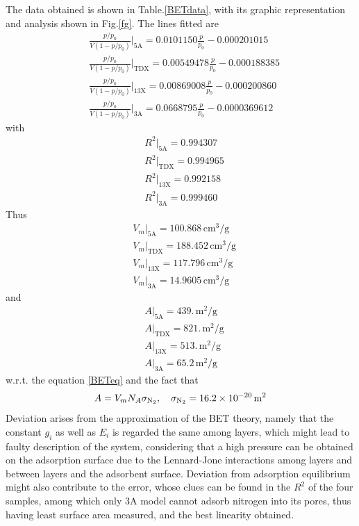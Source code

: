 \documentclass[%
 reprint,
 amsmath,amssymb,
 aps,
10.5pt,
]{revtex4-1}
\begin{document}
The data obtained is shown in Table.\ref{BETdata}, with its graphic representation and analysis shown in Fig.\ref{fg}. The lines fitted are
\begin{align*}
&\frac{p/p_0}{V(1-p/p_0)}\bigg|_\text{5A} = 0.0101150  \frac{p}{p_0}-0.000201015 \\
&\frac{p/p_0}{V(1-p/p_0)}\bigg|_\text{TDX} = 0.00549478\frac{p}{p_0}-0.000188385 \\
&\frac{p/p_0}{V(1-p/p_0)}\bigg|_\text{13X} =  0.00869008 \frac{p}{p_0}-0.000200860 \\
&\frac{p/p_0}{V(1-p/p_0)}\bigg|_\text{3A} = 0.0668795\frac{p}{p_0}-0.0000369612 
   \end{align*}
with
\begin{align*}
& R^2 \bigg|_\text{5A} = 0.994307 \\
& R^2 \bigg|_\text{TDX} = 0.994965 \\
& R^2 \bigg|_\text{13X} = 0.992158 \\
& R^2 \bigg|_\text{3A} = 0.999460 
\end{align*}
Thus 
\begin{align*}
& V_m \bigg|_\text{5A} = 100.868 \,\mathrm{cm^3/g} \\
& V_m \bigg|_\text{TDX} = 188.452\,\mathrm{cm^3/g} \\
& V_m \bigg|_\text{13X} = 117.796 \,\mathrm{cm^3/g}\\
& V_m \bigg|_\text{3A} = 14.9605\,\mathrm{cm^3/g}
\end{align*}
and
\begin{align*}
& A \bigg|_\text{5A} = 439. \,\mathrm{m^2/g}\\
& A \bigg|_\text{TDX} = 821. \,\mathrm{m^2/g}\\
& A \bigg|_\text{13X} = 513. \,\mathrm{m^2/g}\\
& A \bigg|_\text{3A} = 65.2 \,\mathrm{m^2/g}
\end{align*}
w.r.t. the equation \ref{BETeq} and the fact that
\begin{equation}
A = V_m N_A \sigma_\text{\ce{N2}}, \quad \sigma_\text{\ce{N2}} = 16.2 \times 10^{-20} \, \mathrm{m^2}
\end{equation}
Deviation arises from the approximation of the BET theory, namely that the constant $g_i$ as well as $E_i$ is regarded the same among layers, which might lead to faulty description of the system, considering that a high pressure can be obtained on the adsorption surface due to the Lennard-Jone interactions among layers and between layers and the adsorbent surface\cite{shi2018high}. Deviation from adsorption equilibrium might also contribute to the error, whose clues can be found in the $R^2$ of the four samples, among which only 3A model cannot adsorb nitrogen into its pores, thus having least surface area measured, and the best linearity obtained. 
\end{document}
